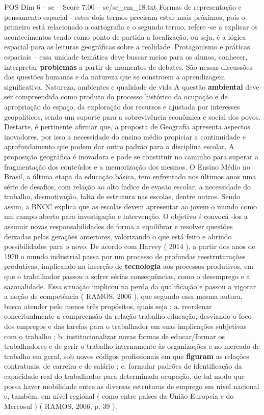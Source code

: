 \begin{textsample}{POS Dim 6 – se – Score 7.00 – se/se\_em\_18.txt}
Formas de representação e pensamento espacial - estes dois termos precisam estar mais próximos, pois o primeiro está relacionado a cartografia e o segundo termo, refere -se a explicar os acontecimentos tendo como ponto de partida a localização, ou seja, é a lógica espacial para as leituras geográficas sobre a realidade.
Protagonismo e práticas espaciais – essa unidade temática deve buscar meios para os alunos, conhecer, interpretar \textbf{problemas} a partir de momentos de debates.
São nessas discussões das questões humanas e da natureza que se constroem a aprendizagem significativa.
Natureza, ambientes e qualidade de vida A questão \textbf{ambiental} deve ser compreendida como produto do processo histórico da ocupação e de apropriação do espaço, da exploração dos recursos e ajustada por interesses geopolíticos, sendo um suporte para a sobrevivência econômica e social dos povos.
Destarte, é pertinente afirmar que, a proposta de Geografia apresenta aspectos inovadores, por isso a necessidade do ensino médio propiciar a continuidade e aprofundamento que podem dar outro padrão para a disciplina escolar.
A proposição geográfica é inovadora e pode se constituir no caminho para superar a fragmentação dos conteúdos e a memorização dos mesmos.
O Ensino Médio no Brasil, a última etapa da educação básica, tem enfrentado nos últimos anos uma série de desafios, com relação ao alto índice de evasão escolar, a necessidade do trabalho, desmotivação, falta de estrutura nas escolas, dentre outros.
Sendo assim, a BNCC explica que as escolas devem apresentar ao jovem o mundo como um campo aberto para investigação e intervenção.
O objetivo é convocá -los a assumir novas responsabilidades de forma a equilibrar e resolver questões deixadas pelas gerações anteriores, valorizando o que está feito e abrindo possibilidades para o novo.
De acordo com Harvey ( 2014 ), a partir dos anos de 1970 o mundo industrial passa por um processo de profundas reestruturações produtivas, implicando na inserção de \textbf{tecnologia} aos processos produtivos, em que o trabalhador passou a sofrer sérias consequências, como o desemprego e a sazonalidade.
Essa situação implicou na perda da qualificação e passou a vigorar a noção de competência ( RAMOS, 2006 ), que segundo essa mesma autora, busca atender pelo menos três propósitos, quais seja : a. reordenar conceitualmente a compreensão da relação trabalho educação, desviando o foco dos empregos e das tarefas para o trabalhador em suas implicações subjetivas com o trabalho ; b. institucionalizar novas formas de educar/formar os trabalhadores e de gerir o trabalho internamente às organizações e no mercado de trabalho em geral, sob novos códigos profissionais em que \textbf{figuram} as relações contratuais, de carreira e de salário ; c. formular padrões de identificação da capacidade real do trabalhador para determinada ocupação, de tal modo que possa haver mobilidade entre as diversas estruturas de emprego em nível nacional e, também, em nível regional ( como entre países da União Europeia e do Mercosul ) ( RAMOS, 2006, p. 39 ).

\end{textsample}
